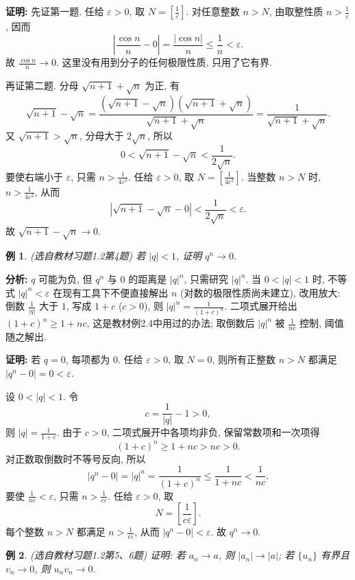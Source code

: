 \documentclass[UTF8,openany]{ctexbook}
\theoremstyle{chinesetextbook}
\newtheorem{example}{例}[section]
\newenvironment{cnproof}{\par\indent\textbf{证明:} \ignorespaces}{\par}
\begin{document}
\begin{cnproof}
先证第一题. 任给 $\varepsilon>0$, 取 $\displaystyle N=\left[\frac1\varepsilon\right]$. 对任意整数 $n>N$, 由取整性质 $\displaystyle n>\frac1\varepsilon$, 因而
\[
\left|\frac{\cos n}{n}-0\right|
=\frac{|\cos n|}{n}\le\frac1n<\varepsilon.
\]
故 $\displaystyle\frac{\cos n}n\to0$. 这里没有用到分子的任何极限性质, 只用了它有界.

再证第二题. 分母 $\sqrt{n+1}+\sqrt n$ 为正, 有
\[
\sqrt{n+1}-\sqrt n
=\frac{(\sqrt{n+1}-\sqrt n)(\sqrt{n+1}+\sqrt n)}{\sqrt{n+1}+\sqrt n}
=\frac1{\sqrt{n+1}+\sqrt n}.
\]
又 $\sqrt{n+1}>\sqrt n$, 分母大于 $2\sqrt n$, 所以
\[
0<\sqrt{n+1}-\sqrt n<\frac1{2\sqrt n}.
\]
要使右端小于 $\varepsilon$, 只需 $\displaystyle n>\frac1{4\varepsilon^2}$. 任给 $\varepsilon>0$, 取 $\displaystyle N=\left[\frac1{4\varepsilon^2}\right]$. 当整数 $n>N$ 时, $\displaystyle n>\frac1{4\varepsilon^2}$, 从而
\[
\left|\sqrt{n+1}-\sqrt n-0\right|<\frac1{2\sqrt n}<\varepsilon.
\]
故 $\sqrt{n+1}-\sqrt n\to0$.
\end{cnproof}
\begin{example}
\textnormal{(选自教材习题1.2第4题)} 若 $|q|<1$, 证明 $q^n\to0$.
\end{example}
\par\indent\textbf{分析:} $q$ 可能为负, 但 $q^n$ 与 $0$ 的距离是 $|q|^n$, 只需研究 $|q|^n$. 当 $0<|q|<1$ 时, 不等式 $|q|^n<\varepsilon$ 在现有工具下不便直接解出 $n$ (对数的极限性质尚未建立), 改用放大: 倒数 $\displaystyle\frac1{|q|}$ 大于 $1$, 写成 $1+c$ ($c>0$), 则 $\displaystyle|q|^n=\frac1{(1+c)^n}$. 二项式展开给出 $(1+c)^n\ge1+nc$, 这是教材例2.4中用过的办法; 取倒数后 $|q|^n$ 被 $\displaystyle\frac1{nc}$ 控制, 阈值随之解出.
\begin{cnproof}
若 $q=0$, 每项都为 $0$. 任给 $\varepsilon>0$, 取 $N=0$, 则所有正整数 $n>N$ 都满足 $|q^n-0|=0<\varepsilon$.

设 $0<|q|<1$. 令
\[
c=\frac1{|q|}-1>0,
\]
则 $\displaystyle|q|=\frac1{1+c}$. 由于 $c>0$, 二项式展开中各项均非负, 保留常数项和一次项得
\[
(1+c)^n\ge1+nc>nc>0.
\]
对正数取倒数时不等号反向, 所以
\[
|q^n-0|=|q|^n=\frac1{(1+c)^n}\le\frac1{1+nc}<\frac1{nc}.
\]
要使 $\displaystyle\frac1{nc}<\varepsilon$, 只需 $\displaystyle n>\frac1{c\varepsilon}$. 任给 $\varepsilon>0$, 取
\[
N=\left[\frac1{c\varepsilon}\right].
\]
每个整数 $n>N$ 都满足 $\displaystyle n>\frac1{c\varepsilon}$, 从而 $|q^n-0|<\varepsilon$. 故 $q^n\to0$.
\end{cnproof}
\begin{example}
\textnormal{(选自教材习题1.2第5、6题)} 证明: 若 $a_n\to a$, 则 $|a_n|\to|a|$; 若 $\{u_n\}$ 有界且 $v_n\to0$, 则 $u_nv_n\to0$.
\end{example}
\end{document}
